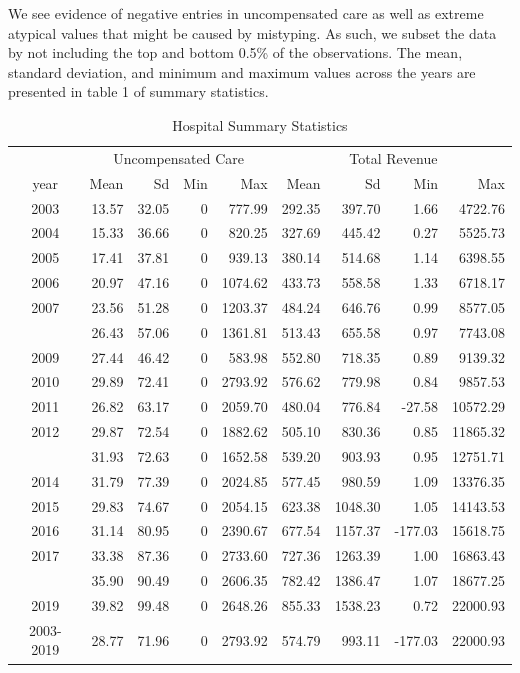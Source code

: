 \documentclass[
  12pt,
]{article}
\begin{document}
We see evidence of negative entries in uncompensated care as well as
extreme atypical values that might be caused by mistyping. As such, we
subset the data by not including the top and bottom 0.5\% of the
observations. The mean, standard deviation, and minimum and maximum
values across the years are presented in table 1 of summary statistics.

\begin{longtable}[t]{crrrrrrrr}
\caption{\label{tab:Tab-1}Hospital Summary Statistics}\\
\toprule
\multicolumn{1}{c}{ } & \multicolumn{4}{c}{Uncompensated Care} & \multicolumn{4}{c}{Total Revenue} \\
\cmidrule(l{3pt}r{3pt}){2-5} \cmidrule(l{3pt}r{3pt}){6-9}
year & Mean & Sd & Min & Max & Mean & Sd & Min & Max\\
\midrule
2003 & 13.57 & 32.05 & 0 & 777.99 & 292.35 & 397.70 & 1.66 & 4722.76\\
2004 & 15.33 & 36.66 & 0 & 820.25 & 327.69 & 445.42 & 0.27 & 5525.73\\
2005 & 17.41 & 37.81 & 0 & 939.13 & 380.14 & 514.68 & 1.14 & 6398.55\\
2006 & 20.97 & 47.16 & 0 & 1074.62 & 433.73 & 558.58 & 1.33 & 6718.17\\
2007 & 23.56 & 51.28 & 0 & 1203.37 & 484.24 & 646.76 & 0.99 & 8577.05\\
\addlinespace
2008 & 26.43 & 57.06 & 0 & 1361.81 & 513.43 & 655.58 & 0.97 & 7743.08\\
2009 & 27.44 & 46.42 & 0 & 583.98 & 552.80 & 718.35 & 0.89 & 9139.32\\
2010 & 29.89 & 72.41 & 0 & 2793.92 & 576.62 & 779.98 & 0.84 & 9857.53\\
2011 & 26.82 & 63.17 & 0 & 2059.70 & 480.04 & 776.84 & -27.58 & 10572.29\\
2012 & 29.87 & 72.54 & 0 & 1882.62 & 505.10 & 830.36 & 0.85 & 11865.32\\
\addlinespace
2013 & 31.93 & 72.63 & 0 & 1652.58 & 539.20 & 903.93 & 0.95 & 12751.71\\
2014 & 31.79 & 77.39 & 0 & 2024.85 & 577.45 & 980.59 & 1.09 & 13376.35\\
2015 & 29.83 & 74.67 & 0 & 2054.15 & 623.38 & 1048.30 & 1.05 & 14143.53\\
2016 & 31.14 & 80.95 & 0 & 2390.67 & 677.54 & 1157.37 & -177.03 & 15618.75\\
2017 & 33.38 & 87.36 & 0 & 2733.60 & 727.36 & 1263.39 & 1.00 & 16863.43\\
\addlinespace
2018 & 35.90 & 90.49 & 0 & 2606.35 & 782.42 & 1386.47 & 1.07 & 18677.25\\
2019 & 39.82 & 99.48 & 0 & 2648.26 & 855.33 & 1538.23 & 0.72 & 22000.93\\
2003-2019 & 28.77 & 71.96 & 0 & 2793.92 & 574.79 & 993.11 & -177.03 & 22000.93\\
\bottomrule
\end{longtable}
\end{document}
